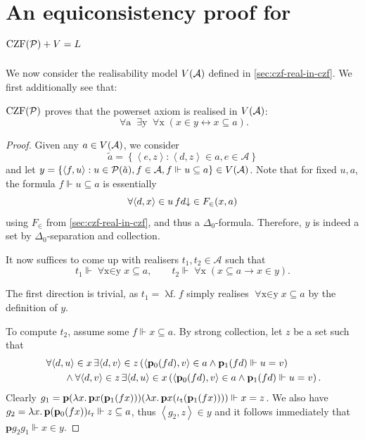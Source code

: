 \documentclass[12pt,openany]{book}
\theoremstyle{plain}
\theoremstyle{definition}
\newcommand\tuple[1]{\left\langle #1 \right\rangle}
\newcommand\opA[1]{\mathop{\forall #1}}
\newcommand\opE[1]{\mathop{\exists #1}}
\newcommand\oplam[1]{\mathop{\lambda #1.}}
\newcommand\Pow{\mathcal{P}}
\newcommand\CZFP{\mathrm{CZF}\mleft(\Pow\mright)}
\newcommand\bp{\mathbf{p}}
\newcommand\ior{\iota_\textup{r}}
\newcommand\iot{\iota_\textup{t}}
\begin{document}
\section{An equiconsistency proof for \texorpdfstring{$\CZFP + V = L$}{CZF(P) + V = L}}
\label{sec:czfp-v-eq-l}

We now consider the realisability model $V\mleft(\mathcal{A}\mright)$ defined in \autoref{sec:czf-real-in-czf}. We first additionally see that:
\begin{lemma}
  \label{lem:czfp-real-powerset}
  $\CZFP$ proves that the powerset axiom is realised in $V\mleft(\mathcal{A}\mright)$:
  \[\opA{a} \opE{y} \opA{x} \left(x \in y \leftrightarrow x \subseteq a\right).\]
\end{lemma}

\begin{proof}
  Given any $a \in V\mleft(\mathcal{A}\mright)$, we consider
  \[\tilde{a} = \left\{\tuple{e, z} : \tuple{d, z} \in a, e \in \mathcal{A}\right\}\]
  and let $y = \left\{\tuple{f, u} : u \in \Pow\mleft(\tilde{a}\mright), f \in \mathcal{A}, f \Vdash u \subseteq a\right\} \in V\mleft(\mathcal{A}\mright)$. Note that for fixed $u, a$, the formula $f \Vdash u \subseteq a$ is essentially
  \[\opA{{\tuple{d, x} \in u}} fd {\downarrow} \in F_\in\mleft(x, a\mright)\]
  using $F_\in$ from \autoref{sec:czf-real-in-czf}, and thus a $\Delta_0$-formula. Therefore, $y$ is indeed a set by $\Delta_0$-separation and collection.

  It now suffices to come up with realisers $t_1, t_2 \in \mathcal{A}$ such that
  \[t_1 \Vdash \opA{x \in y} x \subseteq a, \qquad t_2 \Vdash \opA{x} \left(x \subseteq a \rightarrow x \in y\right).\]

  The first direction is trivial, as $t_1 = \oplam{f} f$ simply realises $\opA{x \in y} x \subseteq a$ by the definition of $y$.

  To compute $t_2$, assume some $f \Vdash x \subseteq a$. By strong collection, let $z$ be a set such that
  \begin{align*}
     & \opA{{\tuple{d, u} \in x}} \opE{{\tuple{d, v} \in z}} \left(\tuple{\bp_0 \mleft(fd\mright), v} \in a \land \bp_1 \mleft(fd\mright) \Vdash u = v\right)               \\
     & \qquad \land \opA{{\tuple{d, v} \in z}} \opE{{\tuple{d, u} \in x}} \left(\tuple{\bp_0 \mleft(fd\mright), v} \in a \land \bp_1 \mleft(fd\mright) \Vdash u = v\right).
  \end{align*}
  Clearly $g_1 = \bp \mleft(\oplam{x} \bp x \mleft(\bp_1 \mleft(fx\mright)\mright)\mright) \mleft(\oplam{x} \bp x \mleft(\iot \mleft(\bp_1 \mleft(fx\mright)\mright)\mright) \mright) \Vdash x = z$. We also have $g_2 = \oplam{x} \bp \mleft(\bp_0 \mleft(fx\mright)\mright) \ior \Vdash z \subseteq a$, thus $\tuple{g_2, z} \in y$ and it follows immediately that $\bp g_2 g_1 \Vdash x \in y$.
\end{proof}
\end{document}
